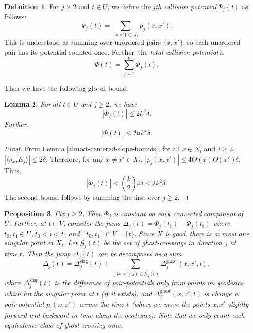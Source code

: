 \documentclass[11pt,reqno,twoside]{amsart}
\newcommand{\sing}{\mathrm{sing}}
\newtheorem{lemma}{Lemma}
\newtheorem{proposition}[lemma]{Proposition}
\theoremstyle{definition}
\newtheorem{definition}[lemma]{Definition}
\begin{document}
\begin{definition}
    For $j \geq 2$ and $t \in U$, we define the $j$\emph{th collision potential} $\Phi_j(t)$ as follows:
    \[
    \Phi_j(t) = \sum_{\{x,x'\} \subset X_t} p_j(x,x').
    \]
    This is understood as summing over unordered pairs $\{x,x'\}$,
    so each unordered pair has its potential counted once. Further, the \emph{total collision potential} is
    \[\Phi(t) = \sum_{j=2}^n \Phi_j(t).\]
   
\end{definition}

    Then we have the following global bound.

    \begin{lemma} \label{potential-global-bound}
    For all $t \in U$ and $j \geq 2$, we have 
    \[|\Phi_j(t)| \leq 2 k^2 \delta.\]
    Further,
    \[|\Phi(t)| \leq 2 nk^2\delta.\]
    \end{lemma}

    \begin{proof}
        From Lemma \ref{almost-centered-slope-bounds}, for all $x \in X_t$ and $j \geq 2$, $|\langle s_x,E_j\rangle| \leq 2\delta$. Therefore, for any $x \neq x' \in X_t$, $|p_j(x,x')| \leq 4\Theta(x)\Theta(x')\delta.$ Thus,
        \[|\Phi_j(t)| \leq  {k \choose 2} 4\delta \leq 2k^2\delta.\]
        The second bound follows by summing the first over $j \geq 2$.
    \end{proof}

    \begin{proposition} \label{potential-local} Fix $j \geq 2$. Then
        $\Phi_j$ is constant on each connected component of $U$. Further, at $t \in V$, consider the jump $\Delta_j(t) = \Phi_j(t_1) - \Phi_j(t_0)$ where $t_0,t_1 \in U$, $t_0 < t < t_1$ and $[t_0,t_1] \cap V = \{t\}$. Since $X$ is good, there is at most one singular point in $X_t$.
        Let $\mathcal{G}_j(t)$ be the set of ghost-crossings in direction $j$ at time $t$. Then the jump $\Delta_j(t)$ can be decomposed as a sum
        \[\Delta_j(t) = \Delta_j^{\sing}(t) + \sum_{(\{x,x'\},j) \in \mathcal{G}_j(t)} \Delta_j^{\mathrm{ghost}}(x,x',t),\]
        where $\Delta_j^\sing(t)$ is the difference of pair-potentials only from points on geodesics which hit the singular point at $t$ (if it exists), and $\Delta_j^{\mathrm{ghost}}(x,x',t)$ is change in pair potential $p_j(x,x')$ across the time $t$ (where we move the points $x,x'$ slightly forward and backward in time along the geodesics). Note that we only count each equivalence class of ghost-crossing once.
    \end{proposition}
\end{document}
